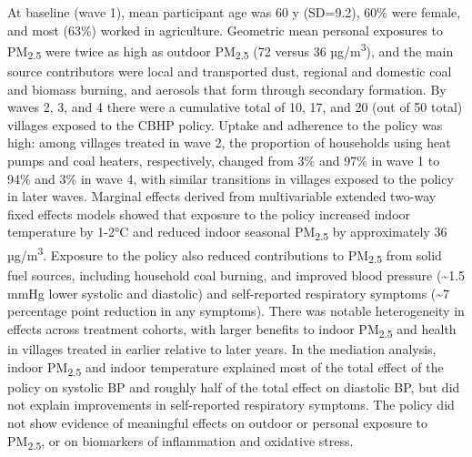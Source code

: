\documentclass[
  letterpaper,
  DIV=11,
  numbers=noendperiod]{scrartcl}
\providecommand{\DIFaddtex}[1]{{\protect\color{blue}\uwave{#1}}} %
\providecommand{\DIFaddbegin}{} %
\providecommand{\DIFaddend}{} %
\providecommand{\DIFdelbegin}{} %
\providecommand{\DIFdelend}{} %
\providecommand{\DIFadd}[1]{\texorpdfstring{\DIFaddtex{#1}}{#1}} %
\newcommand{\DIFscaledelfig}{0.5}
\newlength{\DIFdelgraphicswidth} %
\newlength{\DIFdelgraphicsheight} %
\newcommand{\DIFaddincludegraphics}[2][]{{\color{blue}\fbox{\DIFOincludegraphics[#1]{#2}}}} %
\newcommand{\DIFdelincludegraphics}[2][]{%
\sbox{\DIFdelgraphicsbox}{\DIFOincludegraphics[#1]{#2}}%
\settoboxwidth{\DIFdelgraphicswidth}{\DIFdelgraphicsbox} %
\settoboxtotalheight{\DIFdelgraphicsheight}{\DIFdelgraphicsbox} %
\scalebox{\DIFscaledelfig}{%
\parbox[b]{\DIFdelgraphicswidth}{\usebox{\DIFdelgraphicsbox}\\[-\baselineskip] \rule{\DIFdelgraphicswidth}{0em}}\llap{\resizebox{\DIFdelgraphicswidth}{\DIFdelgraphicsheight}{%
\setlength{\unitlength}{\DIFdelgraphicswidth}%
\begin{picture}(1,1)%
\thicklines\linethickness{2pt} %
{\color[rgb]{1,0,0}\put(0,0){\framebox(1,1){}}}%
{\color[rgb]{1,0,0}\put(0,0){\line( 1,1){1}}}%
{\color[rgb]{1,0,0}\put(0,1){\line(1,-1){1}}}%
\end{picture}%
}\hspace*{3pt}}} %
} %
\DeclareRobustCommand{\DIFaddbegin}{\DIFOaddbegin \let\includegraphics\DIFaddincludegraphics} %
\DeclareRobustCommand{\DIFaddend}{\DIFOaddend \let\includegraphics\DIFOincludegraphics} %
\DeclareRobustCommand{\DIFdelbegin}{\DIFOdelbegin \let\includegraphics\DIFdelincludegraphics} %
\DeclareRobustCommand{\DIFdelend}{\DIFOaddend \let\includegraphics\DIFOincludegraphics} %
\begin{document}
At baseline (wave 1), mean participant age was 60 y (SD=9.2), 60\% were
female, and most (63\%) worked in agriculture. Geometric mean personal
exposures to PM\textsubscript{2.5} were twice as high as outdoor
PM\textsubscript{2.5} (72 versus 36 µg/m\textsuperscript{3}), and the
main source contributors were local and transported dust, regional and
domestic coal and biomass burning, and aerosols that form through
secondary formation. By waves 2, 3, and 4 there were a cumulative total
of 10, 17, and 20 (out of 50 total) villages exposed to the CBHP policy.
Uptake and adherence to the policy was high: among villages treated in
wave 2, the proportion of households using heat pumps and coal heaters,
respectively, changed from 3\% and 97\% in wave 1 to 94\% and 3\% in
wave 4, with similar transitions in villages exposed to the policy in
later waves. Marginal effects derived from multivariable extended
two-way fixed effects models showed that exposure to the policy
increased indoor temperature by 1-2°C and reduced indoor seasonal
PM\textsubscript{2.5} by approximately 36 µg/m\textsuperscript{3}.
Exposure to the policy also reduced contributions to
PM\textsubscript{2.5} from solid fuel sources, including household coal
burning, and improved blood pressure (\textasciitilde1.5 mmHg lower
systolic and diastolic) and self-reported respiratory symptoms
(\textasciitilde7 percentage point reduction in any symptoms). There was
notable heterogeneity in effects across treatment cohorts, with larger
benefits to indoor PM\textsubscript{2.5} and health in villages treated
in earlier relative to later years. In the mediation analysis, indoor
PM\textsubscript{2.5} and indoor temperature explained most of the total
effect of the policy on systolic BP and roughly half of the total effect
on diastolic BP, but did not explain improvements in self-reported
respiratory symptoms. The policy did not show evidence of meaningful
effects on outdoor or personal exposure to PM\textsubscript{2.5}, or on
biomarkers of inflammation and oxidative stress.

\DIFdelbegin %
\DIFdelend \DIFaddbegin \subsubsection*{\DIFadd{Conclusions}}\label{conclusions}
\DIFaddend 
\end{document}
